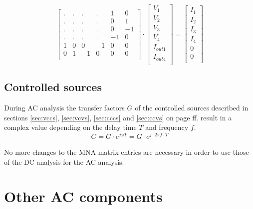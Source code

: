 \begin{equation}
\begin{bmatrix}
.&.&.&.& 1 & 0\\
.&.&.&.& 0 & 1\\
.&.&.&.& 0 &-1\\
.&.&.&.&-1 & 0\\
1 & 0 & 0 & -1 & 0 & 0\\
0 & 1 &-1 &  0 & 0 & 0\\
\end{bmatrix}
\cdot
\begin{bmatrix}
V_{1}\\
V_{2}\\
V_{3}\\
V_{4}\\
I_{out1}\\
I_{out4}\\
\end{bmatrix}
=
\begin{bmatrix}
I_{1}\\
I_{2}\\
I_{3}\\
I_{4}\\
0\\
0\\
\end{bmatrix}
\end{equation}

\subsection{Controlled sources}

During AC analysis the transfer factors $G$ of the controlled sources
described in sections \ref{sec:vccs}, \ref{sec:vcvs}, \ref{sec:cccs}
and \ref{sec:ccvs} on page \pageref{sec:vccs} ff. result in a complex
value depending on the delay time $T$ and frequency $f$.
\begin{equation}
\underline{G} = G\cdot e^{j\omega T} = G\cdot e^{j\cdot 2\pi f\cdot T}
\end{equation}

No more changes to the MNA matrix entries are necessary in order to
use those of the DC analysis for the AC analysis.

\section{Other AC components}

